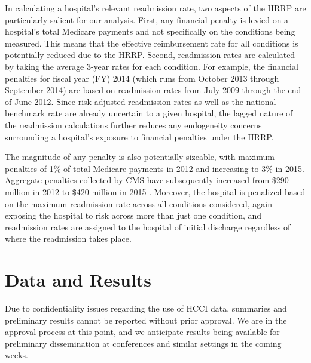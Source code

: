 \documentclass[12pt]{article}
\begin{document}
In calculating a hospital's relevant readmission rate, two aspects of the HRRP are particularly salient for our analysis. First, any financial penalty is levied on a hospital's total Medicare payments and not specifically on the conditions being measured. This means that the effective reimbursement rate for all conditions is potentially reduced due to the HRRP. Second, readmission rates are calculated by taking the average 3-year rates for each condition. For example, the financial penalties for fiscal year (FY) 2014 (which runs from October 2013 through September 2014) are based on readmission rates from July 2009 through the end of June 2012. Since risk-adjusted readmission rates as well as the national benchmark rate are already uncertain to a given hospital, the lagged nature of the readmission calculations further reduces any endogeneity concerns surrounding a hospital's exposure to financial penalties under the HRRP.

The magnitude of any penalty is also potentially sizeable, with maximum penalties of 1\% of total Medicare payments in 2012 and increasing to 3\% in 2015. Aggregate penalties collected by CMS have subsequently increased from \$290 million in 2012 to \$420 million in 2015 \citep{mellor2016}. Moreover, the hospital is penalized based on the maximum readmission rate across all conditions considered, again exposing the hospital to risk across more than just one condition, and readmission rates are assigned to the hospital of initial discharge regardless of where the readmission takes place.

\section{Data and Results}
\label{sec:data}
Due to confidentiality issues regarding the use of HCCI data, summaries and preliminary results cannot be reported without prior approval. We are in the approval process at this point, and we anticipate results being available for preliminary dissemination at conferences and similar settings in the coming weeks.

\pagebreak


\end{document}
